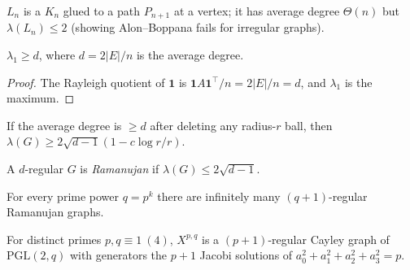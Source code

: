 \begin{definition}
  \label{def:lollipop}
  $L_n$ is a $K_n$ glued to a path $P_{n+1}$ at a vertex; it has average degree
  $\Theta(n)$ but $\lambda(L_n)\le2$ (showing Alon--Boppana fails for irregular
  graphs).
\end{definition}

\begin{claim}
  \label{claim:irregular-lambda1}
  $\lambda_1\ge d$, where $d=2|E|/n$ is the average degree.
\end{claim}
\begin{proof}
  The Rayleigh quotient of $\mathbf 1$ is $\mathbf 1A\mathbf 1^\top/n=2|E|/n=d$,
  and $\lambda_1$ is the maximum.
\end{proof}

\begin{theorem}
  \label{thm:hoory-irregular}
  \notready
  If the average degree is $\ge d$ after deleting any radius-$r$ ball, then
  $\lambda(G)\ge2\sqrt{d-1}(1-c\log r/r)$.
\end{theorem}

\begin{definition}
  \label{def:ramanujan-graph}
  A $d$-regular $G$ is \emph{Ramanujan} if $\lambda(G)\le2\sqrt{d-1}$.
\end{definition}

\begin{theorem}
  \label{thm:ramanujan-existence}
  \notready
  For every prime power $q=p^k$ there are infinitely many $(q+1)$-regular
  Ramanujan graphs.
\end{theorem}

\begin{construction}
  \label{constr:lps}
  \notready
  For distinct primes $p,q\equiv1\ (4)$, $X^{p,q}$ is a $(p+1)$-regular Cayley
  graph of $\mathrm{PGL}(2,q)$ with generators the $p+1$ Jacobi solutions of
  $a_0^2+a_1^2+a_2^2+a_3^2=p$.
\end{construction}

